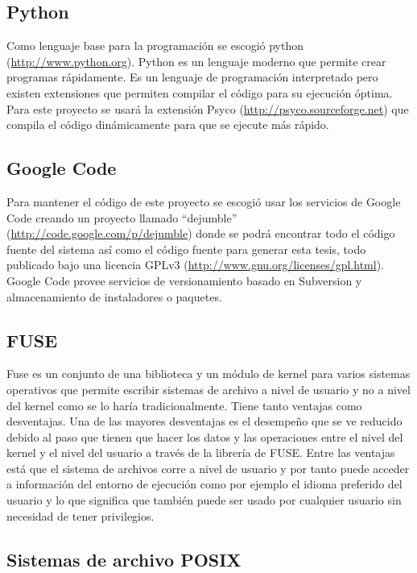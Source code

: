 \subsection{Python}

Como lenguaje base para la programación se escogió python (\url{http://www.python.org}). Python es un lenguaje moderno que permite crear programas rápidamente. Es un lenguaje de programación interpretado pero existen extensiones que permiten compilar el código para su ejecución óptima. Para este proyecto se usará la extensión Psyco (\url{http://psyco.sourceforge.net}) que compila el código dinámicamente para que se ejecute más rápido.

\subsection{Google Code}

Para mantener el código de este proyecto se escogió usar los servicios de Google Code creando un proyecto llamado ``dejumble'' (\url{http://code.google.com/p/dejumble}) donde se podrá encontrar todo el código fuente del sistema así como el código fuente para generar esta tesis, todo publicado bajo una licencia GPLv3 (\url{http://www.gnu.org/licenses/gpl.html}). Google Code provee servicios de versionamiento basado en Subversion y almacenamiento de instaladores o paquetes. 


\subsection{FUSE}

Fuse es un conjunto de una biblioteca y un módulo de kernel para varios sistemas operativos que permite escribir sistemas de archivo a nivel de usuario y no a nivel del kernel como se lo haría tradicionalmente. Tiene tanto ventajas como desventajas. Una de las mayores desventajas es el desempeño que se ve reducido debido al paso que tienen que hacer los datos y las operaciones entre el nivel del kernel y el nivel del usuario a través de la librería de FUSE. Entre las ventajas está que el sistema de archivos corre a nivel de usuario y por tanto puede acceder a información del entorno de ejecución como por ejemplo el idioma preferido del usuario y lo que significa que también puede ser usado por cualquier usuario sin necesidad de tener privilegios.

\subsection{Sistemas de archivo POSIX}

